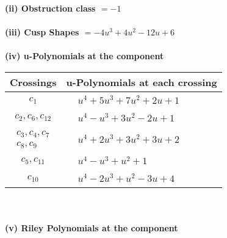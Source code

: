 \documentclass[1p]{elsarticle_modified}
\theoremstyle{definition}
\begin{document}
\flushleft \textbf{(ii) Obstruction class $= -1$}\\~\\
\flushleft \textbf{(iii) Cusp Shapes $= -4 u^3+4 u^2-12 u+6$}\\~\\
\newpage\renewcommand{\arraystretch}{1}
\flushleft \textbf{(iv) u-Polynomials at the component}\newline \\
\begin{tabular}{m{50pt}|m{274pt}}
Crossings & \hspace{64pt}u-Polynomials at each crossing \\
\hline $$\begin{aligned}c_{1}\end{aligned}$$&$\begin{aligned}
&u^4+5 u^3+7 u^2+2 u+1
\end{aligned}$\\
\hline $$\begin{aligned}c_{2},c_{6},c_{12}\end{aligned}$$&$\begin{aligned}
&u^4- u^3+3 u^2-2 u+1
\end{aligned}$\\
\hline $$\begin{aligned}c_{3},c_{4},c_{7}\\c_{8},c_{9}\end{aligned}$$&$\begin{aligned}
&u^4+2 u^3+3 u^2+3 u+2
\end{aligned}$\\
\hline $$\begin{aligned}c_{5},c_{11}\end{aligned}$$&$\begin{aligned}
&u^4- u^3+u^2+1
\end{aligned}$\\
\hline $$\begin{aligned}c_{10}\end{aligned}$$&$\begin{aligned}
&u^4-2 u^3+u^2-3 u+4
\end{aligned}$\\
\hline
\end{tabular}\\~\\
\newpage\renewcommand{\arraystretch}{1}
\flushleft \textbf{(v) Riley Polynomials at the component}\newline \\
\end{document}
